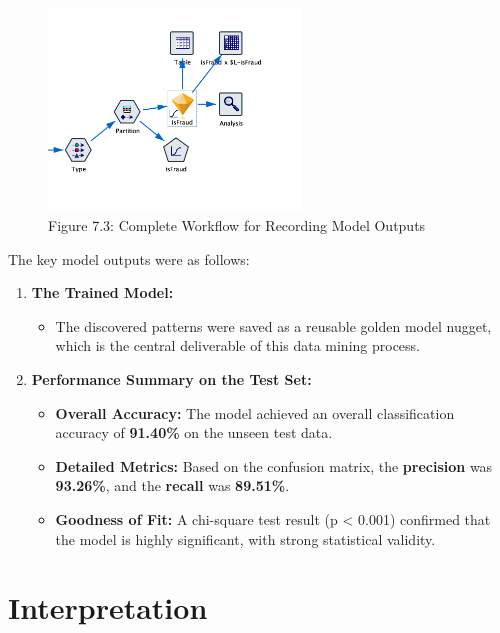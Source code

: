 \documentclass[sigplan,screen]{acmart}
\begin{document}
\begin{figure}[H]
    \centering
    \includegraphics[width=0.6\textwidth]{7.3.png}
    \caption*{Figure 7.3: Complete Workflow for Recording Model Outputs}
    \label{fig:7.3}
\end{figure}

The key model outputs were as follows:

\begin{enumerate}
    \item \textbf{The Trained Model:}
    \begin{itemize}
        \item The discovered patterns were saved as a reusable golden model nugget, which is the central deliverable of this data mining process.
    \end{itemize}
    
    \item \textbf{Performance Summary on the Test Set:}
    \begin{itemize}
        \item \textbf{Overall Accuracy:} The model achieved an overall classification accuracy of \textbf{91.40\%} on the unseen test data.
        \item \textbf{Detailed Metrics:} Based on the confusion matrix, the \textbf{precision} was \textbf{93.26\%}, and the \textbf{recall} was \textbf{89.51\%}.
        \item \textbf{Goodness of Fit:} A chi-square test result (p < 0.001) confirmed that the model is highly significant, with strong statistical validity.
    \end{itemize}
\end{enumerate}

\section{Interpretation}
\end{document}
